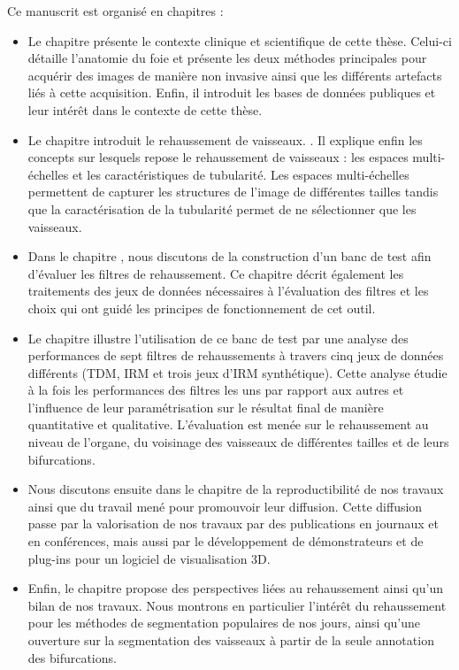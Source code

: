 Ce manuscrit est organisé en \chapTotal{} chapitres : 

\begin{itemize}
\item Le chapitre \chapContextN{} présente le contexte clinique et scientifique de cette thèse. Celui-ci détaille l'anatomie du foie et présente les deux méthodes principales pour acquérir des images de manière non invasive ainsi que les différents artefacts liés à cette acquisition. Enfin, il introduit les bases de données publiques et leur intérêt dans le contexte de cette thèse.
\item Le chapitre \chapSOTAN{} introduit le rehaussement de vaisseaux. . Il explique enfin les concepts sur lesquels repose le rehaussement de vaisseaux : les espaces multi-échelles et les caractéristiques de tubularité. Les espaces multi-échelles permettent de capturer les structures de l'image de différentes tailles tandis que la caractérisation de la tubularité permet de ne sélectionner que les vaisseaux.
\item Dans le chapitre \chapBenchN, nous discutons de la construction d'un banc de test afin d'évaluer les filtres de rehaussement. Ce chapitre décrit également les traitements des jeux de données nécessaires à l'évaluation des filtres et les choix qui ont guidé les principes de fonctionnement de cet outil.
\item Le chapitre \chapAnalysisN{} illustre l'utilisation de ce banc de test par une analyse des performances de sept filtres de rehaussements à travers cinq jeux de données différents (TDM, IRM et trois jeux d'IRM synthétique). Cette analyse étudie à la fois les performances des filtres les uns par rapport aux autres et l'influence de leur paramétrisation sur le résultat final de manière quantitative et qualitative. L'évaluation est menée sur le rehaussement au niveau de l'organe, du voisinage des vaisseaux de différentes tailles et de leurs bifurcations. 
\item Nous discutons ensuite dans le chapitre \chapReproN{} de la reproductibilité de nos travaux ainsi que du travail mené pour promouvoir leur diffusion. Cette diffusion passe par la valorisation de nos travaux par des publications en journaux et en conférences, mais aussi par le développement de démonstrateurs et de plug-ins pour un logiciel de visualisation 3D.
\item Enfin, le chapitre \chapEndN{} propose des perspectives liées au rehaussement ainsi qu'un bilan de nos travaux. Nous montrons en particulier l'intérêt du rehaussement pour les méthodes de segmentation populaires de nos jours, ainsi qu'une ouverture sur la segmentation des vaisseaux à partir de la seule annotation des bifurcations.
\end{itemize}
    